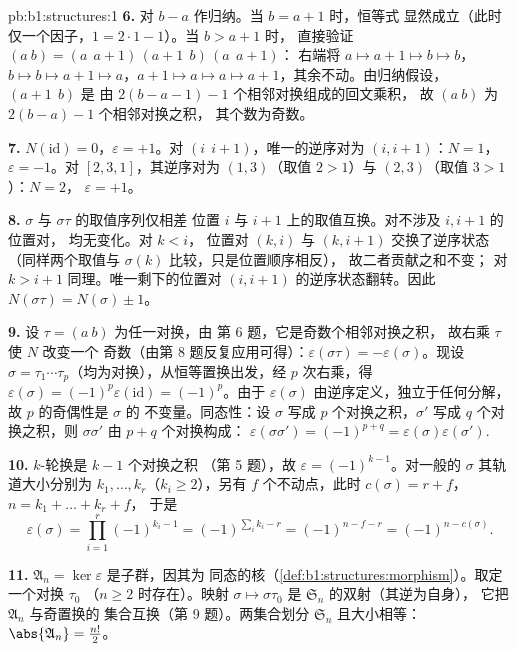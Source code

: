 \begin{solution}{pb:b1:structures:1}
\textbf{6.} 对 $b - a$ 作归纳。当 $b = a + 1$ 时，恒等式
显然成立（此时仅一个因子，$1 = 2\cdot1 - 1$）。当 $b > a + 1$ 时，
直接验证 $(a\ b) = (a\ \ a{+}1)\,(a{+}1\ \ b)\,(a\ \ a{+}1)$：
右端将 $a \mapsto a{+}1 \mapsto b \mapsto b$，$b
\mapsto b \mapsto a{+}1 \mapsto a$，$a{+}1 \mapsto a \mapsto a
\mapsto a{+}1$，其余不动。由归纳假设，$(a{+}1\ \ b)$ 是
由 $2(b - a - 1) - 1$ 个相邻对换组成的回文乘积，
故 $(a\ b)$ 为 $2(b - a) - 1$ 个相邻对换之积，
其个数为奇数。

\textbf{7.} $N(\mathrm{id}) = 0$，$\varepsilon = +1$。对 $(i\ \
i{+}1)$，唯一的逆序对为 $(i, i+1)$：$N = 1$，
$\varepsilon = -1$。对 $[2, 3, 1]$，其逆序对为 $(1,
3)$（取值 $2 > 1$）与 $(2, 3)$（取值 $3 > 1$）：$N = 2$，
$\varepsilon = +1$。

\textbf{8.} $\sigma$ 与 $\sigma\tau$ 的取值序列仅相差
位置 $i$ 与 $i + 1$ 上的取值互换。对不涉及 $i, i+1$ 的位置对，
均无变化。对 $k < i$，
位置对 $(k, i)$ 与 $(k, i+1)$ 交换了逆序状态
（同样两个取值与 $\sigma(k)$ 比较，只是位置顺序相反），
故二者贡献之和不变；
对 $k > i + 1$ 同理。唯一剩下的位置对 $(i,
i+1)$ 的逆序状态翻转。因此 $N(\sigma\tau) = N(\sigma) \pm 1$。

\textbf{9.} 设 $\tau = (a\ b)$ 为任一对换，由
第 6 题，它是奇数个相邻对换之积，
故右乘 $\tau$ 使 $N$ 改变一个
奇数（由第 8 题反复应用可得）：$\varepsilon(\sigma
\tau) = -\varepsilon(\sigma)$。现设 $\sigma = \tau_1\cdots
\tau_p$（均为对换），从恒等置换出发，经 $p$
次右乘，得 $\varepsilon(\sigma) =
(-1)^p\varepsilon(\mathrm{id}) = (-1)^p$。由于
$\varepsilon(\sigma)$ 由逆序定义，独立于任何分解，
故 $p$ 的奇偶性是 $\sigma$ 的
不变量。同态性：设 $\sigma$ 写成 $p$ 个对换之积，$\sigma'$ 写成
$q$ 个对换之积，则 $\sigma\sigma'$ 由 $p + q$ 个对换构成：
$\varepsilon(\sigma\sigma') = (-1)^{p+q} =
\varepsilon(\sigma)\varepsilon(\sigma')$.

\textbf{10.} $k$-轮换是 $k - 1$ 个对换之积
（第 5 题），故 $\varepsilon = (-1)^{k-1}$。对一般的 $\sigma$
其轨道大小分别为 $k_1, \dots, k_r$（$k_i \geq 2$），另有 $f$
个不动点，此时 $c(\sigma) = r + f$，$n = k_1 + \dots + k_r + f$，
于是
\[
\varepsilon(\sigma) = \prod_{i=1}^r (-1)^{k_i - 1}
= (-1)^{\sum_i k_i - r} = (-1)^{n - f - r} = (-1)^{n -
c(\sigma)} .
\]

\textbf{11.} $\mathfrak A_n = \ker\varepsilon$ 是子群，因其为
同态的核（\cref{def:b1:structures:morphism}）。取定一个对换 $\tau_0$
（$n \geq 2$ 时存在）。映射 $\sigma
\mapsto \sigma\tau_0$ 是 $\mathfrak S_n$ 的双射（其逆为自身），
它把 $\mathfrak A_n$ 与奇置换的
集合互换（第 9 题）。两集合划分 $\mathfrak S_n$
且大小相等：$\abs{\mathfrak A_n} = \frac{n!}2$。


\end{solution}
